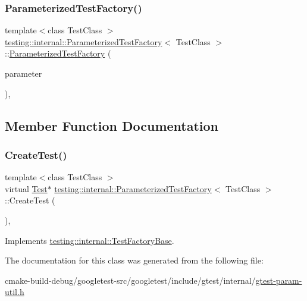 \subsubsection{\texorpdfstring{ParameterizedTestFactory()}{ParameterizedTestFactory()}}
{\footnotesize\ttfamily template$<$class Test\+Class $>$ \\
\mbox{\hyperlink{classtesting_1_1internal_1_1ParameterizedTestFactory}{testing\+::internal\+::\+Parameterized\+Test\+Factory}}$<$ Test\+Class $>$\+::\mbox{\hyperlink{classtesting_1_1internal_1_1ParameterizedTestFactory}{Parameterized\+Test\+Factory}} (\begin{DoxyParamCaption}\item[{\mbox{\hyperlink{classtesting_1_1internal_1_1ParameterizedTestFactory_ad9a27b8e1a83de2f1687625bccff460d}{Param\+Type}}}]{parameter }\end{DoxyParamCaption})\hspace{0.3cm}{\ttfamily [inline]}, {\ttfamily [explicit]}}



\subsection{Member Function Documentation}
\mbox{\label{classtesting_1_1internal_1_1ParameterizedTestFactory_ae17e73e91f7fd5d49ca238c005ef4960}} 
\subsubsection{\texorpdfstring{CreateTest()}{CreateTest()}}
{\footnotesize\ttfamily template$<$class Test\+Class $>$ \\
virtual \mbox{\hyperlink{classtesting_1_1Test}{Test}}$\ast$ \mbox{\hyperlink{classtesting_1_1internal_1_1ParameterizedTestFactory}{testing\+::internal\+::\+Parameterized\+Test\+Factory}}$<$ Test\+Class $>$\+::Create\+Test (\begin{DoxyParamCaption}{ }\end{DoxyParamCaption})\hspace{0.3cm}{\ttfamily [inline]}, {\ttfamily [virtual]}}



Implements \mbox{\hyperlink{classtesting_1_1internal_1_1TestFactoryBase_a07ac3ca0b196cdb092da0bb186b7c030}{testing\+::internal\+::\+Test\+Factory\+Base}}.



The documentation for this class was generated from the following file\+:\begin{DoxyCompactItemize}
\item 
cmake-\/build-\/debug/googletest-\/src/googletest/include/gtest/internal/\mbox{\hyperlink{gtest-param-util_8h}{gtest-\/param-\/util.\+h}}\end{DoxyCompactItemize}
